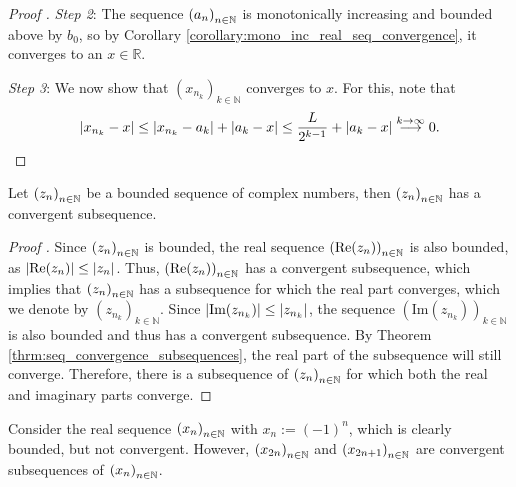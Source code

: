 \begin{proof}[Proof \cite{src:bolzano_weierstrass}]
	\textit{Step 2}: The sequence $\seq[a_n]$ is monotonically increasing and bounded above by $b_0$, so by Corollary \ref{corollary:mono_inc_real_seq_convergence}, it converges to an $x\in\mathbb R$.
	
	\textit{Step 3}: We now show that $\left(x_{n_k}\right)_{k\in\mathbb N}$ converges to $x$. For this, note that
	\[
		\abs{x_{n_k} - x} \leq \abs{x_{n_k} - a_{k}} + \abs{a_k - x} \leq \frac{L}{2^{k-1}} + \abs{a_k - x} \overset{k\to \infty}{\longrightarrow} 0.
	\]
\end{proof}

\begin{corollary}
	Let $\seq[z_n]$ be a bounded sequence of complex numbers, then $\seq[z_n]$ has a convergent subsequence.
\end{corollary}

\begin{proof}[Proof \cite{1250430}]
	Since $\seq[z_n]$ is bounded, the real sequence $\seq[\text{Re}(z_n)]$ is also bounded, as $\abs{\text{Re}(z_n)} \leq \abs{z_n}$. Thus, $\seq[\text{Re}(z_n)]$ has a convergent subsequence, which implies that $\seq[z_n]$ has a subsequence for which the real part converges, which we denote by $\left(z_{n_k}\right)_{k\in \mathbb N}$. Since $\abs{\text{Im}(z_{n_k})} \leq \abs{z_{n_k}}$, the sequence $\left(\text{Im}(z_{n_k})\right)_{k\in\mathbb N}$ is also bounded and thus has a convergent subsequence. By Theorem \ref{thrm:seq_convergence_subsequences}, the real part of the subsequence will still converge. Therefore, there is a subsequence of $\seq[z_n]$ for which both the real and imaginary parts converge.
\end{proof}

\begin{exmp}
	Consider the real sequence $\seq[x_n]$ with $x_n := (-1)^n$, which is clearly bounded, but not convergent. However, $\seq[x_{2n}]$ and $\seq[x_{2n + 1}]$ are convergent subsequences of $\seq[x_n]$.
\end{exmp}